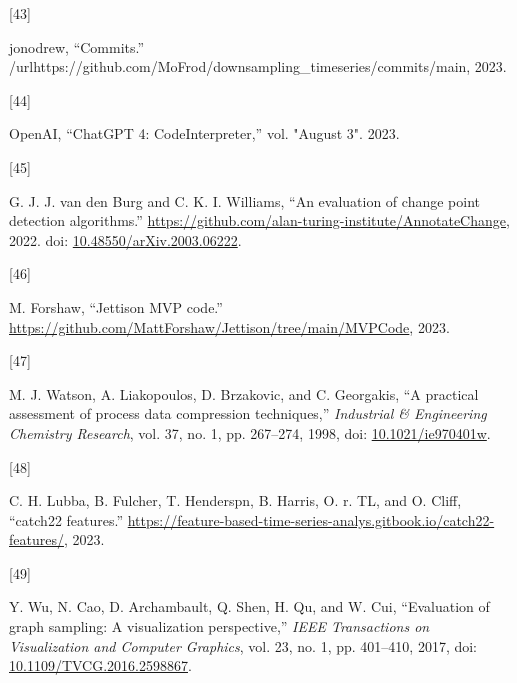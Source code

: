 \documentclass{article}
\newlength{\cslhangindent}
\newlength{\csllabelwidth}
\newlength{\cslentryspacingunit} %
\newenvironment{CSLReferences}[2] %
 {%
  \setlength{\parindent}{0pt}
  \ifodd #1
  \let\oldpar\par
  \def\par{\hangindent=\cslhangindent\oldpar}
  \fi
  \setlength{\parskip}{#2\cslentryspacingunit}
 }%
 {}
\newcommand{\CSLLeftMargin}[1]{\parbox[t]{\csllabelwidth}{#1}}
\newcommand{\CSLRightInline}[1]{\parbox[t]{\linewidth - \csllabelwidth}{#1}\break}
\begin{document}
\begin{CSLReferences}{0}{0}
\leavevmode{}%
\CSLLeftMargin{{[}43{]} }
\CSLRightInline{jonodrew, {``Commits.''}
/url{https://github.com/MoFrod/downsampling\_timeseries/commits/main},
2023.}

\leavevmode{}%
\CSLLeftMargin{{[}44{]} }
\CSLRightInline{OpenAI, {``ChatGPT 4: CodeInterpreter,''} vol. "August
3". 2023.}

\leavevmode{}%
\CSLLeftMargin{{[}45{]} }
\CSLRightInline{G. J. J. van den Burg and C. K. I. Williams, {``An
evaluation of change point detection algorithms.''}
\url{https://github.com/alan-turing-institute/AnnotateChange}, 2022.
doi:
\href{https://doi.org/10.48550/arXiv.2003.06222}{10.48550/arXiv.2003.06222}.}

\leavevmode{}%
\CSLLeftMargin{{[}46{]} }
\CSLRightInline{M. Forshaw, {``Jettison MVP code.''}
\url{https://github.com/MattForshaw/Jettison/tree/main/MVPCode}, 2023.}

\leavevmode{}%
\CSLLeftMargin{{[}47{]} }
\CSLRightInline{M. J. Watson, A. Liakopoulos, D. Brzakovic, and C.
Georgakis, {``A practical assessment of process data compression
techniques,''} \emph{Industrial \& Engineering Chemistry Research}, vol.
37, no. 1, pp. 267--274, 1998, doi:
\href{https://doi.org/10.1021/ie970401w}{10.1021/ie970401w}.}

\leavevmode{}%
\CSLLeftMargin{{[}48{]} }
\CSLRightInline{C. H. Lubba, B. Fulcher, T. Henderspn, B. Harris, O. r.
TL, and O. Cliff, {``catch22 features.''}
\url{https://feature-based-time-series-analys.gitbook.io/catch22-features/},
2023.}

\leavevmode{}%
\CSLLeftMargin{{[}49{]} }
\CSLRightInline{Y. Wu, N. Cao, D. Archambault, Q. Shen, H. Qu, and W.
Cui, {``Evaluation of graph sampling: A visualization perspective,''}
\emph{IEEE Transactions on Visualization and Computer Graphics}, vol.
23, no. 1, pp. 401--410, 2017, doi:
\href{https://doi.org/10.1109/TVCG.2016.2598867}{10.1109/TVCG.2016.2598867}.}

\end{CSLReferences}



\end{document}
